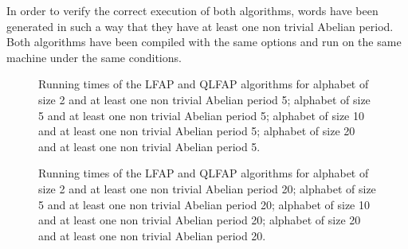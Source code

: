 \documentclass[3p]{elsarticle}
\begin{document}
In order to verify the correct execution of both algorithms, words have been generated in such a way that they have at least one non trivial Abelian period. Both algorithms have been compiled with the same options and run on the same machine under the same conditions.

\begin{figure}

  \hspace{.3cm}

  \hspace{.3cm}
\caption{
\label{fig-expe1}
Running times of the LFAP and QLFAP algorithms for
 \protect{} alphabet of size 2 and at least one non trivial Abelian period 5; 
 \protect{} alphabet of size 5 and at least one non trivial Abelian period 5; 
 \protect{} alphabet of size 10 and at least one non trivial Abelian period 5; 
 \protect{} alphabet of size 20 and at least one non trivial Abelian period 5.
}
\end{figure}

\begin{figure}
  \hspace{.3cm}

  \hspace{.3cm}

\caption{
\label{fig-expe2}
Running times of the LFAP and QLFAP algorithms for
 \protect{} alphabet of size 2 and at least one non trivial Abelian period 20; 
 \protect{} alphabet of size 5 and at least one non trivial Abelian period 20; 
 \protect{} alphabet of size 10 and at least one non trivial Abelian period 20; 
 \protect{} alphabet of size 20 and at least one non trivial Abelian period 20.
}
\end{figure}
\end{document}
